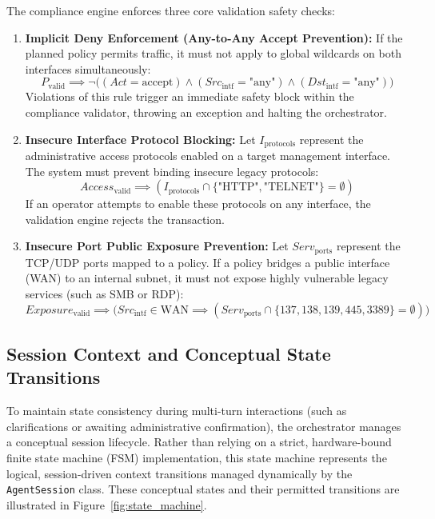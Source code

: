 The compliance engine enforces three core validation safety checks:
\begin{enumerate}
    \item \textbf{Implicit Deny Enforcement (Any-to-Any Accept Prevention):}
    If the planned policy permits traffic, it must not apply to global wildcards on both interfaces simultaneously:
    \begin{equation}
        P_{\text{valid}} \implies \neg \big( (Act = \text{accept}) \land (Src_{\text{intf}} = \text{"any"}) \land (Dst_{\text{intf}} = \text{"any"}) \big)
    \end{equation}
    Violations of this rule trigger an immediate safety block within the compliance validator, throwing an exception and halting the orchestrator.
    
    \item \textbf{Insecure Interface Protocol Blocking:}
    Let $I_{\text{protocols}}$ represent the administrative access protocols enabled on a target management interface. The system must prevent binding insecure legacy protocols:
    \begin{equation}
        Access_{\text{valid}} \implies (I_{\text{protocols}} \cap \{\text{"HTTP"}, \text{"TELNET"}\} = \emptyset)
    \end{equation}
    If an operator attempts to enable these protocols on any interface, the validation engine rejects the transaction.
    
    \item \textbf{Insecure Port Public Exposure Prevention:}
    Let $Serv_{\text{ports}}$ represent the TCP/UDP ports mapped to a policy. If a policy bridges a public interface (WAN) to an internal subnet, it must not expose highly vulnerable legacy services (such as SMB or RDP):
    \begin{equation}
        Exposure_{\text{valid}} \implies \Big( Src_{\text{intf}} \in \text{WAN} \implies (Serv_{\text{ports}} \cap \{137, 138, 139, 445, 3389\} = \emptyset) \Big)
    \end{equation}
\end{enumerate}

\subsection{Session Context and Conceptual State Transitions}
To maintain state consistency during multi-turn interactions (such as clarifications or awaiting administrative confirmation), the orchestrator manages a conceptual session lifecycle. Rather than relying on a strict, hardware-bound finite state machine (FSM) implementation, this state machine represents the logical, session-driven context transitions managed dynamically by the \texttt{AgentSession} class. These conceptual states and their permitted transitions are illustrated in Figure~\ref{fig:state_machine}.

